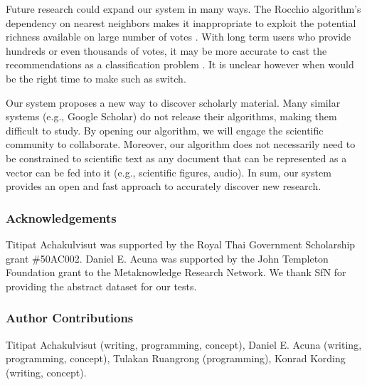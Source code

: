 \documentclass[a4paper]{article}
\begin{document}
Future research could expand our system in many ways. The Rocchio algorithm’s dependency on nearest neighbors makes it inappropriate to exploit the potential richness available on large number of votes \cite{friedman2001elements}. With long term users who provide hundreds or even thousands of votes, it may be more accurate to cast the recommendations as a classification problem \cite{lavrenko2001relevance}. It is unclear however when would be the right time to make such as switch.

Our system proposes a new way to discover scholarly material. Many similar systems (e.g., Google Scholar) do not release their algorithms, making them difficult to study. By opening our algorithm, we will engage the scientific community to collaborate. Moreover, our algorithm does not necessarily need to be constrained to scientific text as any document that can be represented as a vector can be fed into it (e.g., scientific figures, audio). In sum, our system provides an open and fast approach to accurately discover new research.


\subsubsection*{Acknowledgements}

Titipat Achakulvisut was supported by the Royal Thai Government Scholarship grant \#50AC002. Daniel E. Acuna was supported by the John Templeton Foundation grant to the Metaknowledge Research Network. We thank SfN for providing the abstract dataset for our tests.

\subsubsection*{Author Contributions}

Titipat Achakulvisut (writing, programming, concept), Daniel E. Acuna (writing, programming, concept), Tulakan Ruangrong (programming), Konrad Kording (writing, concept).

{}

\end{document}
